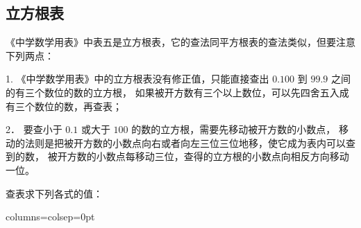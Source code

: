 \subsection{立方根表}\label{subsec:9-5}

《中学数学用表》中表五是立方根表，它的查法同平方根表的查法类似，但要注意下列两点：

1. 《中学数学用表》中的立方根表没有修正值，只能直接查出 $0.100$ 到 $99.9$ 之间的有三个数位的数的立方根，
如果被开方数有三个以上数位，可以先四舍五入成有三个数位的数，再查表；

2． 要查小于 $0.1$ 或大于 $100$ 的数的立方根，需要先移动被开方数的小数点，
移动的法则是把被开方数的小数点向右或者向左三位三位地移，使它成为表内可以查到的数，
被开方数的小数点每移动三位，查得的立方根的小数点向相反方向移动一位。

\liti 查表求下列各式的值：
\begin{xiaoxiaotis}

    \hspace*{1.5em} 

\resetxxt
\jie \begin{tblr}[t]{columns={colsep=0pt}}
     \\
     \\
     \\
\end{tblr}

\end{xiaoxiaotis}

